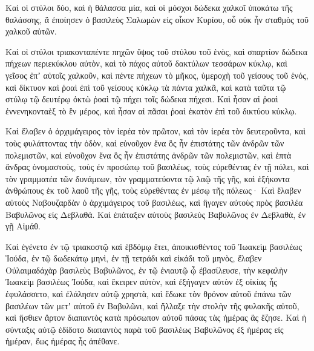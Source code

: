 {Καὶ οἱ στύλοι δύο, καὶ ἡ θάλασσα μία, καὶ οἱ μόσχοι δώδεκα χαλκοῖ ὑποκάτω τῆς θαλάσσης, ἃ ἐποίησεν ὁ βασιλεὺς Σαλωμὼν εἰς οἶκον Κυρίου, οὗ οὐκ ἦν σταθμὸς τοῦ χαλκοῦ αὐτῶν.
\par }{\PP {}Καὶ οἱ στύλοι τριακονταπέντε πηχῶν ὕψος τοῦ στύλου τοῦ ἑνὸς, καὶ σπαρτίον δώδεκα πήχεων περιεκύκλου αὐτὸν, καὶ τὸ πάχος αὐτοῦ δακτύλων τεσσάρων κύκλῳ,
καὶ γεῖσος ἐπʼ αὐτοῖς χαλκοῦν, καὶ πέντε πήχεων τὸ μῆκος, ὑμεροχὴ τοῦ γείσους τοῦ ἑνός, καὶ δίκτυον καὶ ῥοαὶ ἐπὶ τοῦ γείσους κύκλῳ τὰ πάντα χαλκᾶ, καὶ κατὰ ταῦτα τῷ στύλῳ τῷ δευτέρῳ ὀκτὼ ῥοαὶ τῷ πήχει τοῖς δώδεκα πήχεσι.
Καὶ ἦσαν αἱ ῥοαὶ ἐννενηκονταὲξ τὸ ἓν μέρος, καὶ ἦσαν αἱ πᾶσαι ῥοαὶ ἑκατὸν ἐπὶ τοῦ δικτύου κύκλῳ.
\par }{\PP {}Καὶ ἔλαβεν ὁ ἀρχιμάγειρος τὸν ἱερέα τὸν πρῶτον, καὶ τὸν ἱερέα τὸν δευτεροῦντα, καὶ τοὺς φυλάττοντας τὴν ὁδὸν,
καὶ εὐνοῦχον ἕνα ὃς ἦν ἐπιστάτης τῶν ἀνδρῶν τῶν πολεμιστῶν, καὶ εὐνοῦχον ἕνα ὃς ἦν ἐπιστάτης ἀνδρῶν τῶν πολεμιστῶν, καὶ ἑπτὰ ἄνδρας ὀνομαστοὺς, τοὺς ἐν προσώπῳ τοῦ βασιλέως, τοὺς εὑρεθέντας ἐν τῇ πόλει, καὶ τὸν γραμματέα τῶν δυνάμεων, τὸν γραμματεύοντα τῷ λαῷ τῆς γῆς, καὶ ἑξήκοντα ἀνθρώπους ἐκ τοῦ λαοῦ τῆς γῆς, τοὺς εὑρεθέντας ἐν μέσῳ τῆς πόλεως·
Καὶ ἔλαβεν αὐτοὺς Ναβουζαρδὰν ὁ ἀρχιμάγειρος τοῦ βασιλέως, καὶ ἢγαγεν αὐτοὺς πρὸς βασιλέα Βαβυλῶνος εἰς Δεβλαθά.
Καὶ ἐπάταξεν αὐτοὺς βασιλεὺς Βαβυλῶνος ἐν Δεβλαθὰ, ἐν γῇ Αἱμάθ.
\par }{\PP {}Καὶ ἐγένετο ἐν τῷ τριακοστῷ καὶ ἑβδόμῳ ἔτει, ἀποικισθέντος τοῦ Ἰωακεὶμ βασιλέως Ἰούδα, ἐν τῷ δωδεκάτῳ μηνὶ, ἐν τῇ τετράδι καὶ εἰκάδι τοῦ μηνὸς, ἔλαβεν Οὐλαιμαδάχὰρ βασιλεὺς Βαβυλῶνος, ἐν τῷ ἐνιαυτῷ ᾧ ἐβασίλευσε, τὴν κεφαλὴν Ἰωακεὶμ βασιλέως Ἰούδα, καὶ ἔκειρεν αὐτὸν, καὶ ἐξήγαγεν αὐτὸν ἐξ οἰκίας ἧς ἐφυλάσσετο,
καὶ ἐλάλησεν αὐτῷ χρηστὰ, καὶ ἔδωκε τὸν θρόνον αὐτοῦ ἐπάνω τῶν βασιλέων τῶν μετʼ αὐτοῦ ἐν Βαβυλῶνι,
καὶ ἤλλαξε τὴν στολὴν τῆς φυλακῆς αὐτοῦ, καὶ ἤσθιεν ἄρτον διαπαντὸς κατὰ πρόσωπον αὐτοῦ πάσας τὰς ἡμέρας ἃς ἔζησε.
Καὶ ἡ σύνταξις αὐτῷ ἐδίδοτο διαπαντὸς παρὰ τοῦ βασιλέως Βαβυλῶνος ἐξ ἡμέρας εἰς ἡμέραν, ἕως ἡμέρας ἧς ἀπέθανε.
\par }